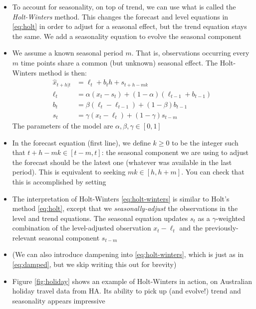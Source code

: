 \documentclass{article}
\begin{document}
\begin{itemize}
\item To account for seasonality, on top of trend, we can use what is called the   
  \emph{Holt-Winters} method. This changes the forecast and level equations in
  \eqref{eq:holt} in order to adjust for a seasonal effect, but the trend
  equation stays the same. We add a seasonality equation to evolve the seasonal
  component    

\item We assume a known seasonal period $m$. That is, observations occurring
  every $m$ time points share a common (but unknown) seasonal effect. The
  Holt-Winters method is then:  
  \begin{equation}
  \label{eq:holt-winters}
  \begin{aligned}
  \hat{x}_{t+h | t} &= \ell_t + b_t h + s_{t+h-mk} \\  
  \ell_t &= \alpha (x_t - s_t) + (1-\alpha) (\ell_{t-1} + b_{t-1}) \\ 
  b_t &= \beta (\ell_t - \ell_{t-1}) + (1-\beta) b_{t-1} \\
  s_t &= \gamma (x_t - \ell_t) + (1-\gamma) s_{t-m}
  \end{aligned}
  \end{equation}
  The parameters of the model are $\alpha,\beta,\gamma \in [0,1]$

\item In the forecast equation (first line), we define $k \geq 0$ to be the
  integer such that $t+h-mk \in [t-m, t]$: the seasonal component we are using
  to adjust the forecast should be the latest one (whatever was available in the
  last period). This is equivalent to seeking $mk \in [h, h+m]$. You can check
  that this is accomplished by setting  

\item The interpretation of Holt-Winters \eqref{eq:holt-winters} is similar to 
  Holt's method \eqref{eq:holt}, except that we \emph{seasonally-adjust} the 
  observations in the level and trend equations. The seasonal equation updates
  $s_t$ as a $\gamma$-weighted combination of the level-adjusted observation
  $x_t - \ell_t$ and the previously-relevant seasonal component $s_{t-m}$   

\item (We can also introduce dampening into \eqref{eq:holt-winters}, which is
  just as in \eqref{eq:damped}, but we skip writing this out for brevity)

\item Figure \ref{fig:holiday} shows an example of Holt-Winters in action, on 
  Australian holiday travel data from HA. Its ability to pick up (and evolve!)
  trend and seasonality appears impressive


\end{itemize}
\end{document}
